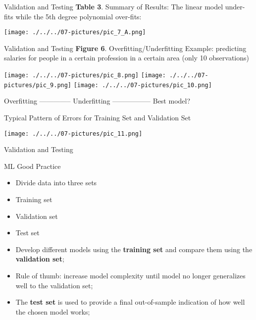 \documentclass[11pt]{beamer}
\begin{document}
\begin{frame}{Validation and Testing}
\textbf{Table 3}. Summary of Results: The linear model under-fits while the 5th degree polynomial over-fits:
	\begin{center}
	\texttt{[image: ./../../07-pictures/pic\_7\_A.png]}
	\end{center}
\end{frame}
\begin{frame}{Validation and Testing}
\textbf{Figure 6}. Overfitting/Underfitting Example: predicting salaries for people in a certain profession in a certain area (only 10 observations)
	\begin{center}
	\texttt{[image: ./../../07-pictures/pic\_8.png]}  \hfill
	\texttt{[image: ./../../07-pictures/pic\_9.png]}  \hfill
	\texttt{[image: ./../../07-pictures/pic\_10.png]}
	\end{center}
	Overfitting -------------- Underfitting	 ----------------- Best model?
\end{frame}
\begin{frame}{Typical Pattern of Errors for Training Set and Validation Set}
	\begin{center}
	\texttt{[image: ./../../07-pictures/pic\_11.png]}
	\end{center}
\end{frame}
\begin{frame}{Validation and Testing}

ML Good Practice

	\begin{itemize}
		\item Divide data into three sets
		\item Training set
		\item Validation set
		\item Test set
		\item Develop different models using the \textbf{training set} and compare them using the \textbf{validation set};
		\item Rule of thumb: increase model complexity until model no longer generalizes well to the validation set;
		\item The \textbf{test set} is used to provide a final out-of-sample indication of how well the chosen model works;
	\end{itemize}
\end{frame}
%
\end{document}
